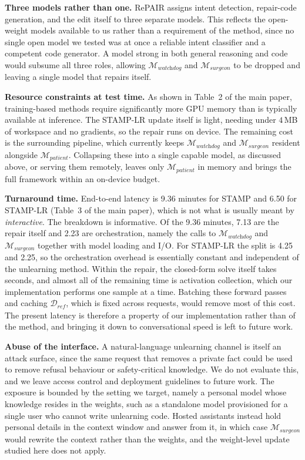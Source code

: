 \noindent
\textbf{Three models rather than one.} RePAIR assigns intent detection, repair-code generation, and the edit itself to three separate models. This reflects the open-weight models available to us rather than a requirement of the method, since no single open model we tested was at once a reliable intent classifier and a competent code generator. A model strong in both general reasoning and code would subsume all three roles, allowing $\mathcal{M}_{\textit{watchdog}}$ and $\mathcal{M}_{\textit{surgeon}}$ to be dropped and leaving a single model that repairs itself.

\noindent
\textbf{Resource constraints at test time.} As shown in Table~2 of the main paper, training-based methods require significantly more GPU memory than is typically available at inference. The STAMP-LR update itself is light, needing under $4$\,MB of workspace and no gradients, so the repair runs on device. The remaining cost is the surrounding pipeline, which currently keeps $\mathcal{M}_{\textit{watchdog}}$ and $\mathcal{M}_{\textit{surgeon}}$ resident alongside $\mathcal{M}_{\textit{patient}}$. Collapsing these into a single capable model, as discussed above, or serving them remotely, leaves only $\mathcal{M}_{\textit{patient}}$ in memory and brings the full framework within an on-device budget. %

\noindent
\textbf{Turnaround time.} End-to-end latency is 9.36 minutes for STAMP and 6.50 for STAMP-LR (Table~3 of the main paper), which is not what is usually meant by \textit{interactive}. The breakdown is informative. Of the 9.36 minutes, 7.13 are the repair itself and 2.23 are orchestration, namely the calls to $\mathcal{M}_{\textit{watchdog}}$ and $\mathcal{M}_{\textit{surgeon}}$ together with model loading and I/O. For STAMP-LR the split is 4.25 and 2.25, so the orchestration overhead is essentially constant and independent of the unlearning method. Within the repair, the closed-form solve itself takes seconds, and almost all of the remaining time is activation collection, which our implementation performs one sample at a time. Batching these forward passes and caching $\mathcal{D}_{\textit{ref}}$, which is fixed across requests, would remove most of this cost. The present latency is therefore a property of our implementation rather than of the method, and bringing it down to conversational speed is left to future work. %

\noindent
\textbf{Abuse of the interface.} A natural-language unlearning channel is itself an attack surface, since the same request that removes a private fact could be used to remove refusal behaviour or safety-critical knowledge. We do not evaluate this, and we leave access control and deployment guidelines to future work. The exposure is bounded by the setting we target, namely a personal model whose knowledge resides in the weights, such as a standalone model provisioned for a single user who cannot write unlearning code. Hosted assistants instead hold personal details in the context window and answer from it, in which case $\mathcal{M}_{\textit{surgeon}}$ would rewrite the context rather than the weights, and the weight-level update studied here does not apply.

